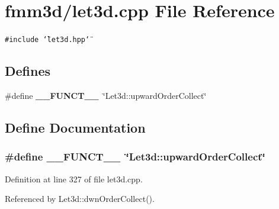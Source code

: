 \section{fmm3d/let3d.cpp File Reference}
\label{let3d_8cpp}


{\tt \#include \char`\"{}let3d.hpp\char`\"{}}\par
\subsection*{Defines}
\begin{CompactItemize}
\item 
\#define {\bf \_\-\_\-FUNCT\_\-\_\-}~\char`\"{}Let3d::upward\-Order\-Collect\char`\"{}
\end{CompactItemize}


\subsection{Define Documentation}
\subsubsection{\setlength{\rightskip}{0pt plus 5cm}\#define \_\-\_\-FUNCT\_\-\_\-~\char`\"{}Let3d::upward\-Order\-Collect\char`\"{}}\label{let3d_8cpp_2818853adf63a17949cf67d73c1d4473_2818853adf63a17949cf67d73c1d4473}




Definition at line 327 of file let3d.cpp.

Referenced by Let3d::dwn\-Order\-Collect().